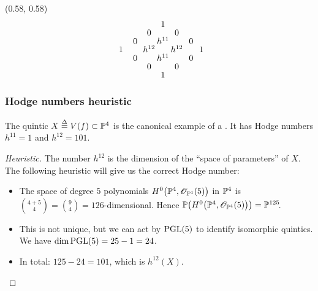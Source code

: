 \begin{frame}
{
    \begin{textblock}{0.4}(0.58, 0.58)
        \[
            \arraycolsep = 1pt%
            \def\arraystretch{0.5}%
            \begin{array}[c]{ccccccc}
                \phantom{h^03}  & \phantom{h^{02}} & \phantom{20} & 1 \\
                &&  0 && 0      & \phantom{h^30}                      \\
                &   0 && h^{11} && 0                                  \\
                    1 && h^{12} && h^{12} && 1                        \\
                &   0 && h^{11} && 0                                  \\
                &&  0 && 0 \vphantom{h^{32}}                          \\
                &&& 1 &&   \vphantom{h^{33}}
            \end{array}
        \]
    \end{textblock}
}
\end{frame}

\begin{frame}
\frametitle{Hodge numbers heuristic}

The quintic $X \defeq V(f) \subset \P^4$ is the canonical example of a \CY. It has Hodge numbers $h^{11}=1$ and $h^{12}=101$.

\pause

\begin{proof}[Heuristic]
    The number $h^{12}$ is the dimension of the ``space of parameters'' of $X$. The following heuristic will give us the correct Hodge number:
    \pause
    \begin{itemize}[<+->]
      \item
      The space of degree $5$ polynomials $H^0\big(\P^4, \OO_{\P^4}(5)\big)$ in $\P^4$ is $\binom{4 + 5}{4} = \binom{9}{4} = 126$-dimensional. Hence $\P\big(H^0\big(\P^4, \OO_{\P^4}(5)\big)\big) = \P^{125}\mkern-4mu$.

      \item
      This is not unique, but we can act by $\PGL(5)$ to identify isomorphic quintics. We have $\dim \PGL(5)=25-1=24$.

      \item
      In total: $125 - 24 = 101$, which is $h^{12}(X)$.
      \qedhere
    \end{itemize}
\end{proof}

\end{frame}

